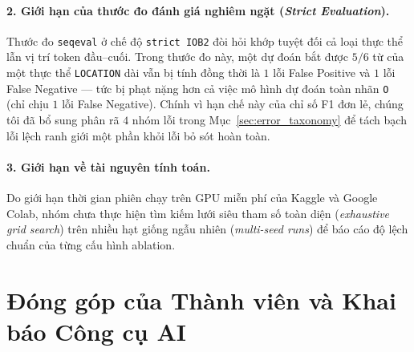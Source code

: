 \documentclass[11pt,a4paper,twocolumn]{article}
\begin{document}
\paragraph{2. Giới hạn của thước đo đánh giá nghiêm ngặt (\textit{Strict Evaluation}).}
Thước đo \texttt{seqeval} ở chế độ \texttt{strict IOB2} đòi hỏi khớp tuyệt đối cả loại thực thể lẫn vị trí token đầu--cuối. Trong thước đo này, một dự đoán bắt được $5/6$ từ của một thực thể \texttt{LOCATION} dài vẫn bị tính đồng thời là $1$ lỗi False Positive và $1$ lỗi False Negative — tức bị phạt nặng hơn cả việc mô hình dự đoán toàn nhãn \texttt{O} (chỉ chịu $1$ lỗi False Negative). Chính vì hạn chế này của chỉ số F1 đơn lẻ, chúng tôi đã bổ sung phân rã $4$ nhóm lỗi trong Mục~\ref{sec:error_taxonomy} để tách bạch lỗi lệch ranh giới một phần khỏi lỗi bỏ sót hoàn toàn.

\paragraph{3. Giới hạn về tài nguyên tính toán.}
Do giới hạn thời gian phiên chạy trên GPU miễn phí của Kaggle và Google Colab, nhóm chưa thực hiện tìm kiếm lưới siêu tham số toàn diện (\textit{exhaustive grid search}) trên nhiều hạt giống ngẫu nhiên (\textit{multi-seed runs}) để báo cáo độ lệch chuẩn của từng cấu hình ablation.

\section*{Đóng góp của Thành viên và Khai báo Công cụ AI}
\label{sec:contributions}
\end{document}
